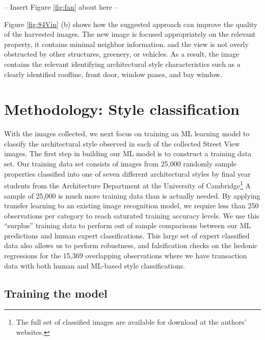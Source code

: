 \documentclass[]{article}
\begin{document}
\begin{center}
  -- Insert Figure \ref{fig:fan} about here --
\end{center}

Figure \ref{fig:84Vin} (b) shows how the suggested approach can improve the quality of the harvested images. The new image is focused appropriately on the relevant property, it contains minimal neighbor information. and the view is not overly obstructed by other structures, greenery, or vehicles. As a result, the image contains the relevant identifying architectural style characteristics such as a clearly identified roofline, front door, window panes, and bay window.


\hypertarget{image-classification}{%
\section{Methodology: Style classification}\label{image-classification}}

With the images collected, we next focus on training an ML learning model to classify the architectural style observed in each of the collected Street View images. The first step in building our ML model is to construct a training data set. Our training data set consists of images from 25,000 randomly sample properties classified into one of seven different architectural styles by final year students from the Architecture Department at the University of Cambridge\footnote{The full set of classified images are available for download at the authors' websites.} A sample of 25,000 is much more training data than is actually needed. By applying transfer learning to an existing image recognition model, we require less than 250 observations per category to reach saturated training accuracy levels. We use this ``surplus'' training data to perform out of sample comparisons between our ML predictions and human expert classifications. This large set of expert classified data also allows us to perform robustness, and falsification checks on the hedonic regressions for the 15,369 overlapping observations where we have transaction data with both human and ML-based style classifications.

\hypertarget{transfer-learning}{%
\subsection{Training the model}\label{transfer-learning}}
\end{document}
